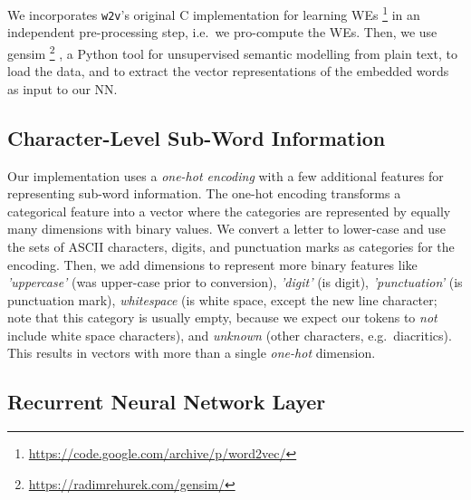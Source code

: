 \documentclass[11pt]{article}
\newcommand\wtv{\texttt{w2v}\xspace}
\begin{document}
We incorporates \wtv's original C implementation for learning WEs%
\footnote{\url{https://code.google.com/archive/p/word2vec/}}
in an independent pre-processing step, i.e.~we pro-compute the WEs.
Then, we use gensim%
\footnote{\url{https://radimrehurek.com/gensim/}}%
, a Python tool for unsupervised semantic modelling from plain text, to load
the data, and to extract the vector representations of the embedded words as
input to our NN.


\subsection{Character-Level Sub-Word Information} %

Our implementation uses a \emph{one-hot encoding} with a few additional
features for representing sub-word information.
The one-hot encoding transforms a categorical feature into a vector where
the categories are represented by equally many dimensions with binary values.
We convert a letter to lower-case and use the sets of ASCII characters, digits,
and punctuation marks as categories for the encoding.
Then, we add dimensions to represent more binary features like
\emph{'uppercase'} (was upper-case prior to conversion), \emph{'digit'} (is
digit), \emph{'punctuation'} (is punctuation mark), \emph{whitespace} (is white
space, except the new line character; note that this category is usually empty,
because we expect our tokens to \emph{not} include white space characters), and
\emph{unknown} (other characters, e.g.~diacritics).
This results in vectors with more than a single \emph{one-hot} dimension. 
%

\subsection{Recurrent Neural Network Layer} %
\end{document}
